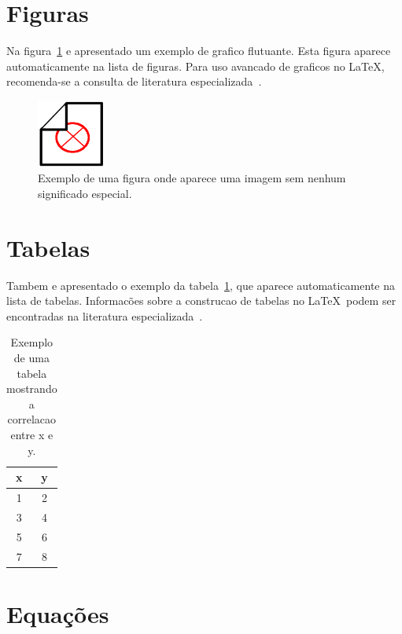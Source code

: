 \documentclass[openright]{normas-utf-tex} %
\begin{document}
\section{Figuras}

Na figura~\ref{fig:dummy} e apresentado um exemplo de grafico flutuante. Esta figura aparece automaticamente na lista de figuras. Para uso avancado de graficos no \LaTeX, recomenda-se a consulta de literatura especializada~\cite{Goossens2007}.


\begin{figure}[!htb]
	\centering
	\includegraphics[width=0.2\textwidth]{./dummy.png} %
	\caption[Figure example]{Exemplo de uma figura onde aparece uma imagem sem nenhum significado especial.}
	\label{fig:dummy}
\end{figure}


\section{Tabelas}

Tambem e apresentado o exemplo da tabela~\ref{tab:correlacao}, que aparece automaticamente na lista de tabelas. Informac\~oes sobre a construcao de tabelas no \LaTeX\ podem ser encontradas na literatura especializada~\cite{Lamport1986,Buerger1989,Kopka2003,Mittelbach2004}.

\begin{table}[!htb]
	\centering
	\caption[Table example]{Exemplo de uma tabela mostrando a correlacao entre x e y.}
	\label{tab:correlacao}
	\begin{tabular}{cc}
		\hline 
		x & y \\
		\hline
		1 & 2 \\
		3 & 4 \\
		5 & 6 \\
		7 & 8 \\
		\hline 
	\end{tabular}
\end{table}

\section{Equações}
\end{document}
